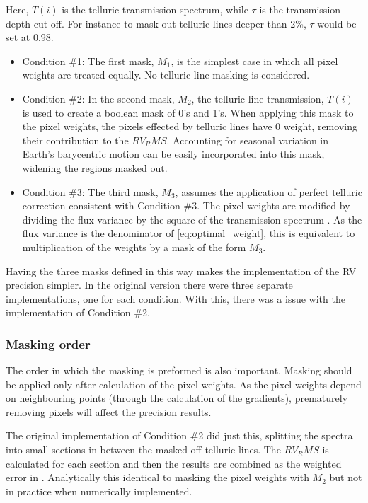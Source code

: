 Here, \(T(i)\) is the telluric transmission spectrum, while \(\tau\) is the transmission depth cut-off. For instance to mask out telluric lines deeper than 2\%,  \(\tau\) would be set at 0.98.

\begin{itemize}
    \item Condition \#1:
    The first mask, \(M_1\), is the simplest case in which all pixel weights are treated equally. No telluric line masking is considered. 

    \item Condition \#2:
    In the second mask, \(M_2\), the telluric line transmission, \(T(i)\) is used to create a boolean mask of 0's and 1's. When applying this mask to the pixel weights, the pixels effected by telluric lines have 0 weight, removing their contribution to the {\red{} \(RV_RMS\)}. Accounting for seasonal variation in Earth's barycentric motion can be easily incorporated into this mask, widening the regions masked out.

    \item Condition \#3: 
    The third mask, \(M_3\), assumes the application of perfect telluric correction consistent with Condition \#3. The pixel weights are modified by dividing the flux variance by the square of the transmission spectrum . As the flux variance is the denominator of \ref{eq:optimal_weight}, this is equivalent to multiplication of the weights by a mask of the form \(M_3\).
\end{itemize}

Having the three masks defined in this way makes the implementation of the RV precision simpler. In the original version there were three separate implementations, one for each condition. With this,  there was a issue with the implementation of Condition \#2. 

\subsubsection{Masking order}
\label{subsubsec:masking_order}
The order in which the masking is preformed is also important. Masking should be applied only after calculation of the pixel weights. As the pixel weights depend on neighbouring points (through the calculation of the gradients), prematurely removing pixels will affect the precision results.

The original implementation of Condition \#2 did just this, splitting the spectra into small sections in between the masked off telluric lines. The {\red{}\(RV_RMS\)} is calculated for each section and then the results are combined as the weighted error in {\red{} } . Analytically this identical to masking the pixel weights with \(M_2\) but not in practice when numerically implemented. 

